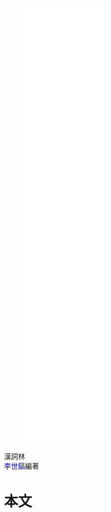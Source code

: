 \documentclass[a5paper,10pt]{book}
\begin{document}
\frontmatter
\linespread{1.25}
\begin{figure}
\includegraphics[height=230mm]{cover.png}
\end{figure}
\hfill
\vfill
{\Huge\textcolor{deepblue}{漢詞林}}\\
{\textcolor{blue}{李世鎬}\hspace{14pt}編著}
\vspace{64pt}
\newpage
\addtolength{\topmargin}{20mm}
\mainmatter
\linespread{1.25}


\chapter*{本文}
\begin{multicols}{4}

\end{multicols}

\appendix
{}
\end{document}
